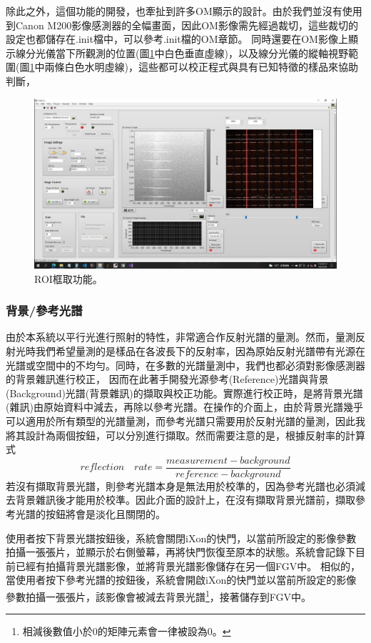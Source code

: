 \documentclass[12pt]{article}
\begin{document}
除此之外，這個功能的開發，也牽扯到許多OM顯示的設計。由於我們並沒有使用到Canon M200影像感測器的全幅畫面，因此OM影像需先經過裁切，這些裁切的設定也都儲存在.init檔中，可以參考.init檔的OM章節。
同時還要在OM影像上顯示線分光儀當下所觀測的位置(圖\ref{figure: roi}中白色垂直虛線)，以及線分光儀的縱軸視野範圍(圖\ref{figure: roi}中兩條白色水明虛線)，這些都可以校正程式與具有已知特徵的樣品來協助判斷，
\begin{figure}
    \centering
    \includegraphics[width=\linewidth]{roi.jpeg}
    \caption{ROI框取功能。}
    \label{figure: roi}
\end{figure}

\subsubsection{背景/參考光譜} \label{sec: bkg/ref}
由於本系統以平行光進行照射的特性，非常適合作反射光譜的量測。然而，量測反射光時我們希望量測的是樣品在各波長下的反射率，因為原始反射光譜帶有光源在光譜或空間中的不均勻。同時，在多數的光譜量測中，我們也都必須對影像感測器的背景雜訊進行校正，
因而在此著手開發光源參考(Reference)光譜與背景(Background)光譜(背景雜訊)的擷取與校正功能。實際進行校正時，是將背景光譜(雜訊)由原始資料中減去，再除以參考光譜。在操作的介面上，由於背景光譜幾乎可以適用於所有類型的光譜量測，而參考光譜只需要用於反射光譜的量測，因此我將其設計為兩個按鈕，可以分別進行擷取。然而需要注意的是，根據反射率的計算式
\begin{equation}\label{equation: reflection}
    reflection \quad rate=\frac{measurement-background}{reference-background}
\end{equation}
若沒有擷取背景光譜，則參考光譜本身是無法用於校準的，因為參考光譜也必須減去背景雜訊後才能用於校準。因此介面的設計上，在沒有擷取背景光譜前，擷取參考光譜的按鈕將會是淡化且關閉的。

使用者按下背景光譜按鈕後，系統會關閉iXon的快門，以當前所設定的影像參數拍攝一張張片，並顯示於右側螢幕，再將快門恢復至原本的狀態。系統會記錄下目前已經有拍攝背景光譜影像，並將背景光譜影像儲存在另一個FGV中。
相似的，當使用者按下參考光譜的按鈕後，系統會開啟iXon的快門並以當前所設定的影像參數拍攝一張張片，該影像會被減去背景光譜\footnote{相減後數值小於0的矩陣元素會一律被設為0。}，接著儲存到FGV中。
\end{document}
